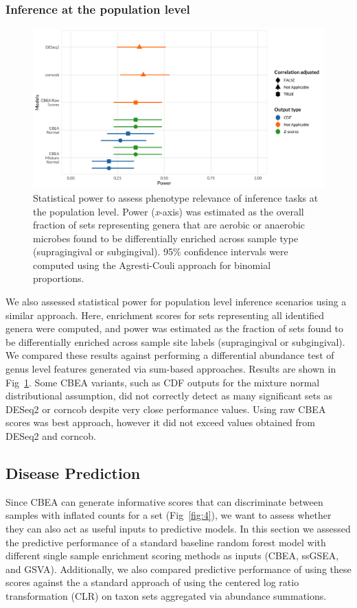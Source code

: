 \documentclass[10pt,letterpaper]{article}
\begin{document}
\subsubsection*{Inference at the population level}
\begin{figure}[!h]
    \centering
    \includegraphics[width = \textwidth]{figures/data_diffab_pwr.png}
    \caption{Statistical power to assess phenotype relevance of inference tasks at the population level. Power (\emph{x}-axis) was estimated as the overall fraction of sets representing genera that are aerobic or anaerobic microbes found to be differentially enriched across sample type (supragingival or subgingival). 95\% confidence intervals were computed using the Agresti-Couli approach for binomial proportions.}  
    \label{fig:5}
\end{figure}

We also assessed statistical power for population level inference scenarios using a similar approach. Here, enrichment scores for sets representing all identified genera were computed, and power was estimated as the fraction of sets found to be differentially enriched across sample site labels (supragingival or subgingival). We compared these results against performing a differential abundance test of genus level features generated via sum-based approaches. Results are shown in Fig~\ref{fig:5}. Some CBEA variants, such as CDF outputs for the mixture normal distributional assumption, did not correctly detect as many significant sets as DESeq2 or corncob despite very close performance values. Using raw CBEA scores was best approach, however it did not exceed values obtained from DESeq2 and corncob. 

\subsection*{Disease Prediction}   
Since CBEA can generate informative scores that can discriminate between samples with inflated counts for a set (Fig~\ref{fig:4}), we want to assess whether they can also act as useful inputs to predictive models. In this section we assessed the predictive performance of a standard baseline random forest model \cite{breiman2001} with different single sample enrichment scoring methods as inputs (CBEA, ssGSEA, and GSVA). Additionally, we also compared predictive performance of using these scores against the a standard approach of using the centered log ratio transformation (CLR) on taxon sets aggregated via abundance summations.     
\end{document}
